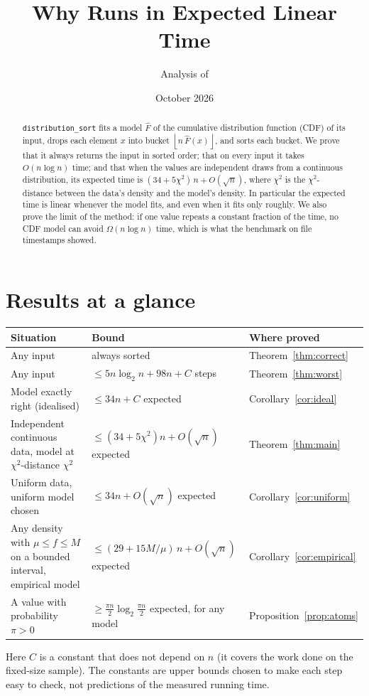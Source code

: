 \documentclass[11pt]{article}
\title{Why \code{distribution\_sort} Runs in Expected Linear Time}
\author{Analysis of \code{Linear Time Sort/distribution\_sort.py}}
\date{October 2026}
\theoremstyle{definition}
\theoremstyle{remark}
\newcommand{\Fh}{\widehat{F}}
\newcommand{\floor}[1]{\left\lfloor #1 \right\rfloor}
\newcommand{\code}[1]{\texttt{#1}}
\begin{document}
\maketitle

\begin{abstract}
\code{distribution\_sort} fits a model $\Fh$ of the cumulative distribution
function (CDF) of its input, drops each element $x$ into bucket
$\floor{n\,\Fh(x)}$, and sorts each bucket. We prove that it always returns
the input in sorted order; that on every input it takes $O(n\log n)$ time;
and that when the values are independent draws from a continuous
distribution, its expected time is
$(34+5\chi^2)\,n+O(\sqrt n)$, where $\chi^2$ is the $\chi^2$-distance
between the data's density and the model's density. In particular the
expected time is linear whenever the model fits, and even when it fits
only roughly. We also prove the limit of the method: if one value repeats
a constant fraction of the time, no CDF model can avoid
$\Omega(n\log n)$ time, which is what the benchmark on file timestamps
showed.
\end{abstract}

\section*{Results at a glance}
\begin{center}
\renewcommand{\arraystretch}{1.15}
\begin{tabular}{@{}>{\raggedright}p{}>{\raggedright}p{}>{\raggedright\arraybackslash}p{}@{}}
\toprule
Situation & Bound & Where proved\\
\midrule
Any input & always sorted & Theorem~\ref{thm:correct}\\
Any input & $\le 5n\log_2 n+98n+C$ steps & Theorem~\ref{thm:worst}\\
Model exactly right (idealised) & $\le 34n+C$ expected & Corollary~\ref{cor:ideal}\\
Independent continuous data, model at $\chi^2$-distance $\chi^2$ & $\le(34+5\chi^2)n+O(\sqrt n)$ expected & Theorem~\ref{thm:main}\\
Uniform data, uniform model chosen & $\le 34n+O(\sqrt n)$ expected & Corollary~\ref{cor:uniform}\\
Any density with $\mu\le f\le M$ on a bounded interval, empirical model & $\le(29+15M/\mu)\,n+O(\sqrt n)$ expected & Corollary~\ref{cor:empirical}\\
A value with probability $\pi>0$ & $\ge\tfrac{\pi n}{2}\log_2\tfrac{\pi n}{2}$ expected, for any model & Proposition~\ref{prop:atoms}\\
\bottomrule
\end{tabular}
\end{center}
Here $C$ is a constant that does not depend on $n$ (it covers the work done
on the fixed-size sample). The constants are upper bounds chosen to make
each step easy to check, not predictions of the measured running time.
\end{document}
